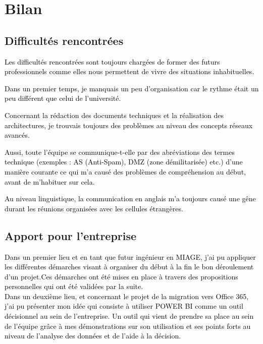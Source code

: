 
\chapter{Bilan}
\vspace{-1cm}
\section{Difficultés rencontrées}

\textcolor{black}{Les difficultés rencontrées sont toujours chargées de former des futurs professionnels comme elles nous permettent de vivre des situations inhabituelles.

Dans un premier temps, je manquais un peu d'organisation car le rythme était un peu différent que celui de l'université. 

Concernant la rédaction des documents techniques et la réalisation des architectures, je trouvais toujours des problèmes au niveau des concepts réseaux avancés.

Aussi, toute l'équipe se communique-t-elle par des abréviations des termes technique (exemples : AS (Anti-Spam), DMZ (zone démilitarisée) etc.) d'une manière courante ce qui m'a causé des problèmes de compréhension au début, avant de m'habituer sur cela.

Au niveau linguistique, la communication en anglais m'a toujours causé  une gêne durant les réunions organisées avec les cellules étrangères.
}

\section{Apport pour l’entreprise}

\textcolor{black}{Dans un premier lieu et en tant que futur ingénieur en MIAGE, j’ai pu appliquer les différentes démarches visant à organiser du début à la fin le bon déroulement d'un projet.Ces démarches ont été mises en place à travers des propositions personnelles qui ont été validées par la suite.}
~~\\

\textcolor{black}{Dans un deuxième lieu, et concernant le projet de la migration vers Office 365, j’ai pu présenter mon idée qui consiste à utiliser POWER BI comme un outil décisionnel au sein de l’entreprise. Un outil qui vient de prendre sa place au sein de l’équipe grâce à mes démonstrations sur son utilisation et ses points forts au niveau de l’analyse des données et de l’aide à la décision.}
